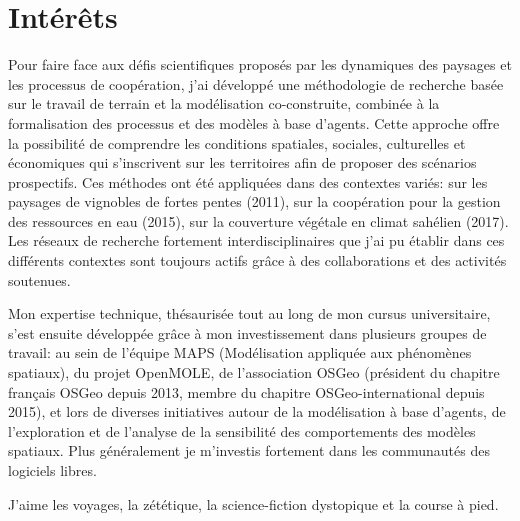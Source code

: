 \documentclass[]{cv-etienne}
\begin{document}
\section{Intérêts}
Pour faire face aux défis scientifiques proposés par les dynamiques des paysages et les processus de coopération, j'ai développé une méthodologie de recherche basée sur le travail de terrain et la modélisation co-construite, combinée à la formalisation des processus et des modèles à base d'agents.
Cette approche offre la possibilité de comprendre les conditions spatiales, sociales, culturelles et économiques qui s'inscrivent sur les territoires afin de proposer des scénarios prospectifs.
Ces méthodes ont été appliquées dans des contextes variés: sur les paysages de vignobles de fortes pentes (2011), sur la coopération pour la gestion des ressources en eau (2015), sur la couverture végétale en climat sahélien (2017).
Les réseaux de recherche fortement interdisciplinaires que j'ai pu établir dans ces différents contextes sont toujours actifs grâce à des collaborations et des activités soutenues.

Mon expertise technique, thésaurisée tout au long de mon cursus universitaire, s'est ensuite développée grâce à mon investissement dans plusieurs groupes de travail: au sein de l'équipe MAPS (Modélisation appliquée aux phénomènes spatiaux), du projet OpenMOLE, de l'association OSGeo (président du chapitre français OSGeo depuis 2013, membre du chapitre OSGeo-international depuis 2015), et lors de diverses initiatives autour de la modélisation à base d'agents, de l'exploration et de l'analyse de la sensibilité des comportements des modèles spatiaux. Plus généralement je m'investis fortement dans les communautés des logiciels libres.

J'aime les voyages, la zététique, la science-fiction dystopique et la course à pied.
\end{document}
